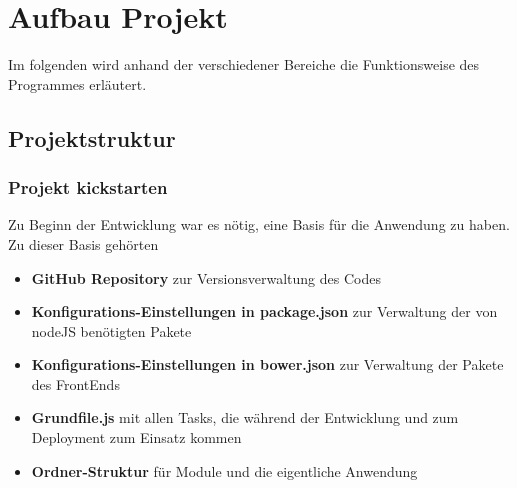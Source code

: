 \chapter{Aufbau Projekt}
Im folgenden wird anhand der verschiedener Bereiche die Funktionsweise des Programmes erläutert. 


\section{Projektstruktur}
\subsection{Projekt kickstarten}
Zu Beginn der Entwicklung war es nötig, eine Basis für die Anwendung zu haben. Zu dieser Basis gehörten
\begin{itemize}
\item \textbf{GitHub Repository} zur Versionsverwaltung des Codes
\item \textbf{Konfigurations-Einstellungen in package.json} zur Verwaltung der von nodeJS benötigten Pakete
\item \textbf{Konfigurations-Einstellungen in bower.json} zur Verwaltung der Pakete des FrontEnds
\item \textbf{Grundfile.js} mit allen Tasks, die während der Entwicklung und zum Deployment zum Einsatz kommen
\item \textbf{Ordner-Struktur} für Module und die eigentliche Anwendung
\end{itemize}

